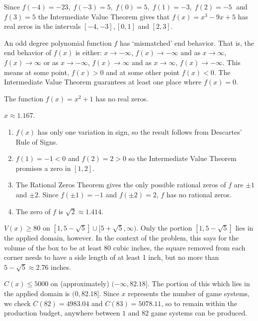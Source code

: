 \begin{exenum}

\item Since $f(-4)=-23,\; f(-3)=5,\; f(0)=5,\; f(1)=-3,\; f(2)=-5\;$ and $f(3)=5$ the Intermediate Value Theorem gives that $f(x) = x^{3} - 9x + 5$ has real zeros in the intervals $[-4, -3], [0, 1]$ and $[2, 3]$. 


\item  An odd degree polynomial  function $f$ has `mismatched' end behavior.  That is, the end behavior of $f(x)$ is either:   $x \rightarrow -\infty$, $f(x) \rightarrow -\infty$ and as $x \rightarrow \infty$, $f(x) \rightarrow \infty$  or as  $x \rightarrow -\infty$, $f(x) \rightarrow \infty$ and as $x \rightarrow \infty$, $f(x) \rightarrow -\infty$.  This means at some point, $f(x) > 0$ and at some other point $f(x) < 0$.  The Intermediate Value Theorem guarantees at least one place where $f(x) = 0$.

\item  The function $f(x) = x^2+1$ has no real zeros.

\item  $x \approx 1.167$.

\item  \begin{enumerate} 

\item  $f(x)$ has only one variation in sign, so the result follows from Descartes' Rule of Signs.

 \item $f(1) = -1<0$ and $f(2) = 2>0$ so the Intermediate Value Theorem promises a zero in $[1,2]$.

\item The Rational Zeros Theorem gives the only possible rational zeros of $f$ are $\pm 1$ and $\pm 2$.  Since $f(\pm 1) = -1$ and $f(\pm 2) = 2$, $f$ has no rational zeros.  

\item  The zero of $f$ is $\sqrt{2} \approx 1.414$. 

\end{enumerate}

\item  $V(x) \geq 80$ on $[1,5-\sqrt{5}] \cup [5+\sqrt{5}, \infty)$.  Only the portion $[1,5-\sqrt{5}]$ lies in the applied domain, however.   In the context of the problem, this says for the volume of the box to be at least 80 cubic inches, the square removed from each corner needs to have a side length of at least 1 inch, but no more than $5-\sqrt{5} \approx 2.76$ inches.

\item $C(x) \leq 5000$ on (approximately) $(-\infty, 82.18]$.  The portion of this which lies in the applied domain is $(0,82.18]$.  Since $x$ represents the number of game systems, we check $C(82) = 4983.04$ and $C(83) = 5078.11$, so to remain within the production budget, anywhere between $1$ and $82$ game systems can be produced.

\end{exenum}
